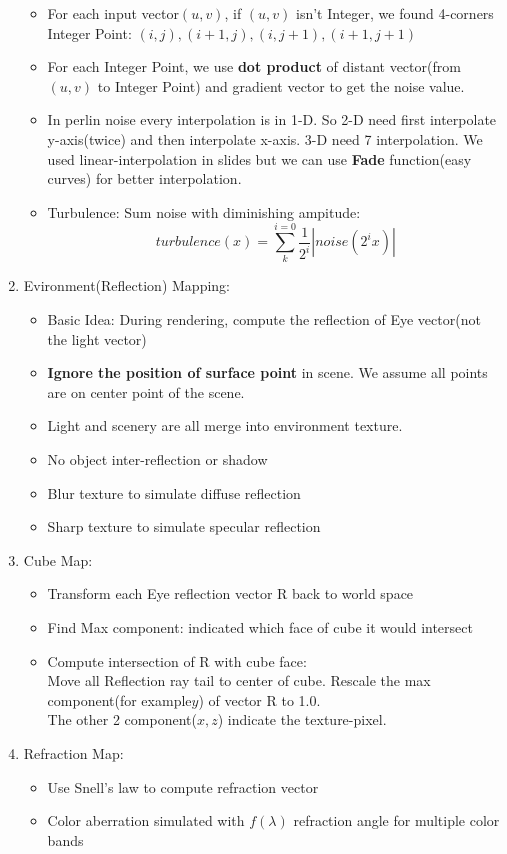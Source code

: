 \documentclass[cyan,normal,en]{elegantnote}
\begin{document}
\begin{enumerate}
\begin{itemize}
\begin{itemize}
		\end{itemize}
		\item For each input vector$(u,v)$, if $(u,v)$ isn't Integer, we found 4-corners Integer Point: $(i,j),(i+1,j),(i,j+1),(i+1,j+1)$
		\item For each Integer Point, we use \textbf{dot product} of distant vector(from $(u,v)$ to Integer Point) and gradient vector to get the noise value.
		\item In perlin noise every interpolation is in 1-D. So 2-D need first interpolate y-axis(twice) and then interpolate x-axis. 3-D need 7 interpolation.
		We used linear-interpolation in slides but we can use \textbf{Fade} function(easy curves) for better interpolation.
		\item Turbulence: Sum noise with diminishing ampitude:
		$$turbulence(x)=\sum_{k}^{i=0} \frac{1}{2^i}|noise(2^i x)|$$
	\end{itemize}
	\item Evironment(Reflection) Mapping:
	\begin{itemize}
		\item Basic Idea: During rendering, compute the reflection of Eye vector(not the light vector)
		\item \textbf{Ignore the position of surface point} in scene. We assume all points are on center point of the scene.
		\item Light and scenery are all merge into environment texture.
		\item No object inter-reflection or shadow
		\item Blur texture to simulate diffuse reflection
		\item Sharp texture to simulate specular reflection
	\end{itemize}
	\item Cube Map:
	\begin{itemize}
		\item Transform each Eye reflection vector R back to world space
		\item Find Max component: indicated which face of cube it would intersect
		\item Compute intersection of R with cube face:\\
		Move all Reflection ray tail to center of cube.
		Rescale the max component(for example$y$) of vector R to 1.0.\\
		The other 2 component($x,z$) indicate the texture-pixel.
	\end{itemize}
	\item Refraction Map:
	\begin{itemize}
		\item Use Snell's law to compute refraction vector
		\item Color aberration simulated with $f(\lambda)$ refraction angle for multiple color bands
	\end{itemize}
\end{enumerate}
\end{document}
